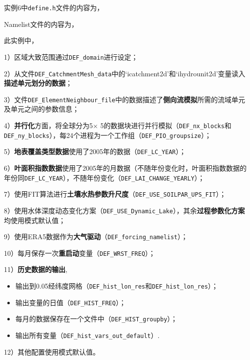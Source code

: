 实例6中\texttt{define.h}文件的内容为，


Namelist文件的内容为，


此实例中，\par
1）区域大致范围通过\texttt{DEF\_domain}进行设定；\par
2）从文件\texttt{DEF\_CatchmentMesh\_data}中的`icatchment2d'和`ihydrounit2d'变量读入\textbf{描述单元划分的数据}；\par
3）文件\texttt{DEF\_ElementNeighbour\_file}中的数据描述了\textbf{侧向流模拟}所需的流域单元及单元之间的参数信息；\par
4）\textbf{并行化}方面，将全球分为5\textdegree$\times$ 5\textdegree 的数据块进行并行模拟（\texttt{DEF\_nx\_blocks}和\texttt{DEF\_ny\_blocks}），每24个进程为一个工作组（\texttt{DEF\_PIO\_groupsize}）；\par
5）\textbf{地表覆盖类型数据}使用了2005年的数据（\texttt{DEF\_LC\_YEAR}）；\par
6）\textbf{叶面积指数数据}使用了2005年的月数据（不随年份变化时，叶面积指数数据的年份同\texttt{DEF\_LC\_YEAR}），不随年份变化（\texttt{DEF\_LAI\_CHANGE\_YEARLY}）；\par
7）使用FIT算法进行\textbf{土壤水热参数升尺度}（\texttt{DEF\_USE\_SOILPAR\_UPS\_FIT}）；\par
8）使用水体深度动态变化方案（\texttt{DEF\_USE\_Dynamic\_Lake}），其余\textbf{过程参数化方案}均使用模式默认值；\par
9）使用ERA5数据作为\textbf{大气驱动}（\texttt{DEF\_forcing\_namelist}）；\par
10）每月保存一次\textbf{重启动}变量（\texttt{DEF\_WRST\_FREQ}）；\par
11）\textbf{历史数据的输出},
\begin{itemize}[nosep,leftmargin=4em]
    \item 输出到0.05\textdegree 经纬度网格（\texttt{DEF\_hist\_lon\_res}和\texttt{DEF\_hist\_lon\_res}）；
    \item 输出变量的日值（\texttt{DEF\_HIST\_FREQ}）；
    \item 每月的数据保存在一个文件中（\texttt{DEF\_HIST\_groupby}）；
    \item 输出所有变量（\texttt{DEF\_hist\_vars\_out\_default}）.
\end{itemize}\par
12）其他配置使用模式默认值。

